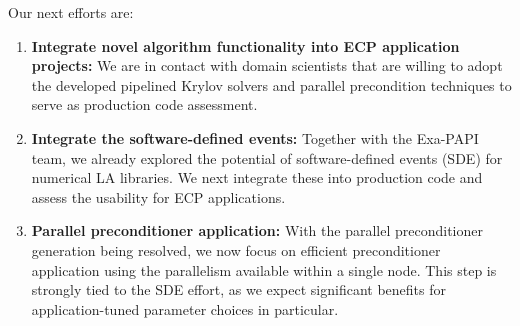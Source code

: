 Our next efforts are:
\begin{enumerate}
	\item \textbf{Integrate novel algorithm functionality into ECP application 
	projects:} We are in contact with domain scientists that are willing to 
	adopt the developed pipelined Krylov solvers and parallel precondition 
	techniques to serve as production code assessment.
	\item \textbf{Integrate the software-defined events:} Together with the 
	Exa-PAPI team, we already explored the potential of software-defined events 
	(SDE) for numerical LA libraries. We next integrate these into production 
	code and assess the usability for ECP applications.
	\item \textbf{Parallel preconditioner application:} With the parallel 
	preconditioner generation being resolved, we now focus on efficient 
	preconditioner application using the parallelism available within a single 
	node. This step is strongly tied to the SDE effort, as we expect significant 
	benefits for application-tuned parameter choices in particular.
\end{enumerate}
